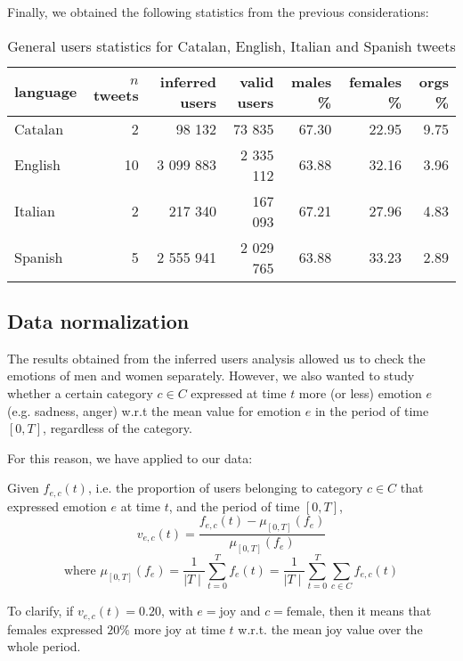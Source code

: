 Finally, we obtained the following statistics from the previous considerations:

\begin{table}[h]
	\centering
	\begin{tabular}{lrrrrrr}
		\toprule
		\textbf{language} & \textbf{\(n\) tweets} & \textbf{inferred users} & \textbf{valid users} & \textbf{males \%} & \textbf{females \%} & \textbf{orgs \%}
		\\
		\midrule
		Catalan & 2 & 98 132 & 73 835 & 67.30 & 22.95 & 9.75
		\\
		English & 10 & 3 099 883 & 2 335 112 & 63.88 & 32.16 & 3.96 
		\\
		Italian & 2 & 217 340 & 167 093 & 67.21 & 27.96 & 4.83 
		\\
		Spanish & 5 & 2 555 941 & 2 029 765 & 63.88 & 33.23 & 2.89 
		\\
		\bottomrule
	\end{tabular}
	\caption{General users statistics for Catalan, English, Italian and Spanish tweets}
	\label{tab:users-languages}
\end{table}

\subsection{Data normalization}
\label{subsec:normalization2}

The results obtained from the inferred users analysis allowed us to check the emotions of men and women separately. However, we also wanted to study whether a certain category \(c \in C\) expressed at time \(t\) more (or less) emotion \(e\) (e.g. sadness, anger) w.r.t the mean value for emotion \(e\) in the period of time \([0, T]\), regardless of the category.

For this reason, we have applied  to our data:
	
\begin{definition}
\label{def:categories-normalization}
	Given \(f_{e, c}(t)\), i.e. the proportion of users belonging to category \(c \in C\) that expressed emotion \(e\) at time \(t\), and the period of time \([0,T]\),
	\[v_{e, c}(t) = \frac{f_{e, c}(t) - \mu_{[0,T]}(f_e)}{\mu_{[0,T]}(f_e)}\]
	\[\text{where } \mu_{[0,T]}(f_e) = \frac{1}{\mid T \mid} \sum_{t =0}^{T} f_e(t) = \frac{1}{\mid T \mid} \sum_{t =0}^{T} \sum_{c \in C} f_{e, c}(t)\] 
\end{definition}

To clarify, if \(v_{e, c}(t) = 0.20\), with \(e = \text{joy}\) and \(c = \text{female}\), then it means that females expressed \(20\%\) more joy at time \(t\) w.r.t. the mean joy value over the whole period.

